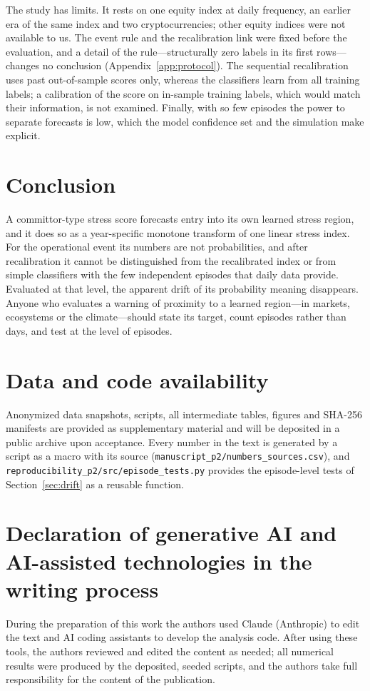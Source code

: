 \documentclass[preprint,12pt,authoryear]{elsarticle}
\begin{document}
The study has limits. It rests on one equity index at daily frequency, an earlier era of the same index and two cryptocurrencies; other equity indices were not available to us. The event rule and the recalibration link were fixed before the evaluation, and a detail of the rule---structurally zero labels in its first \LabelRows rows---changes no conclusion (Appendix~\ref{app:protocol}). The sequential recalibration uses past out-of-sample scores only, whereas the classifiers learn from all training labels; a calibration of the score on in-sample training labels, which would match their information, is not examined. Finally, with so few episodes the power to separate forecasts is low, which the model confidence set and the simulation make explicit.

\section{Conclusion}
A committor-type stress score forecasts entry into its own learned stress region, and it does so as a year-specific monotone transform of one linear stress index. For the operational event its numbers are not probabilities, and after recalibration it cannot be distinguished from the recalibrated index or from simple classifiers with the few independent episodes that daily data provide. Evaluated at that level, the apparent drift of its probability meaning disappears. Anyone who evaluates a warning of proximity to a learned region---in markets, ecosystems or the climate---should state its target, count episodes rather than days, and test at the level of episodes.

\section*{Data and code availability}
Anonymized data snapshots, scripts, all intermediate tables, figures and SHA-256 manifests are provided as supplementary material and will be deposited in a public archive upon acceptance. Every number in the text is generated by a script as a macro with its source (\texttt{manuscript\_p2/numbers\_sources.csv}), and \texttt{reproducibility\_p2/src/episode\_tests.py} provides the episode-level tests of Section~\ref{sec:drift} as a reusable function.

\section*{Declaration of generative AI and AI-assisted technologies in the writing process}
During the preparation of this work the authors used Claude (Anthropic) to edit the text and AI coding assistants to develop the analysis code. After using these tools, the authors reviewed and edited the content as needed; all numerical results were produced by the deposited, seeded scripts, and the authors take full responsibility for the content of the publication.
\end{document}
